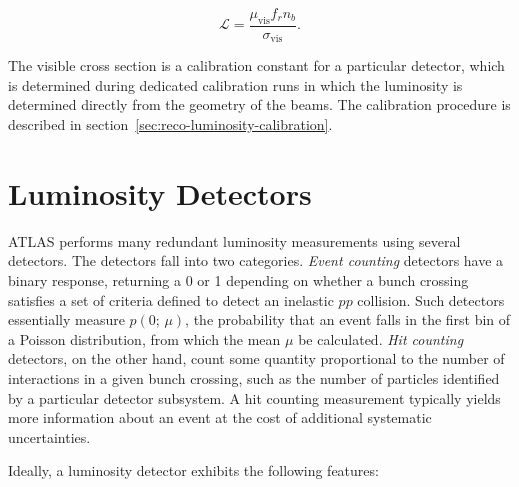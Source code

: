 \begin{equation}\label{eqn:reco-luminosity-detected}
	\mathcal{L} = \frac{\mu_{\mathrm{vis}} f_r n_b}{\sigma_{\mathrm{vis}}}.
\end{equation}

The visible cross section is a calibration constant for a particular detector, which is determined during dedicated calibration runs in which the luminosity is determined directly from the geometry of the beams. The calibration procedure is described in section~\ref{sec:reco-luminosity-calibration}. 

\section{Luminosity Detectors}\label{sec:reco-luminosity-detectors}
ATLAS performs many redundant luminosity measurements using several detectors. The detectors fall into two categories. \emph{Event counting} detectors have a binary response, returning a 0 or 1 depending on whether a bunch crossing satisfies a set of criteria defined to detect an inelastic $pp$ collision. Such detectors essentially measure $p(0;\,\mu)$, the probability that an event falls in the first bin of a Poisson distribution, from which the mean $\mu$ be calculated. \emph{Hit counting} detectors, on the other hand, count some quantity proportional to the number of interactions in a given bunch crossing, such as the number of particles identified by a particular detector subsystem. A hit counting measurement typically yields more information about an event at the cost of additional systematic uncertainties.

Ideally, a luminosity detector exhibits the following features: 

